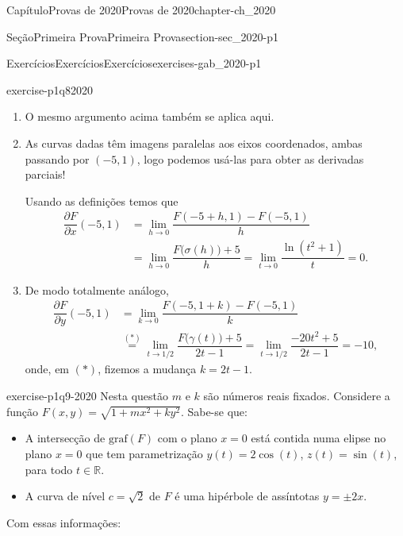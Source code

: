 \documentclass[oneside,10pt,]{book}
\numberwithin{equation}{section}
\begin{document}
\begin{chapterptx}{Capítulo}{Provas de 2020}{}{Provas de 2020}{}{}{chapter-ch_2020}
\begin{sectionptx}{Seção}{Primeira Prova}{}{Primeira Prova}{}{}{section-sec_2020-p1}
\begin{exercises-subsection-numberless}{Exercícios}{Exercícios}{}{Exercícios}{}{}{exercises-gab_2020-p1}
\begin{divisionexercise}{8}{}{}{exercise-p1q82020}
\begin{enumerate}[label=\roman*]
\begin{align*}
\lim\limits_{t\to 1/2}F\big(\gamma(t)\big)&
=\lim\limits_{t\to 1/2}-20t^2=-5\text{ e}\\
\lim\limits_{t\to 0}F\big(\sigma(t)\big)&
=\lim\limits_{t\to 0}\ln(t^2+1)-5=-5,
\end{align*}
temos informações sobre \(F\) apenas ao longo de duas curvas. Poderia haver uma terceira curva ao longo da qual a função não tem o mesmo comportamento, o que mostraria sua descontinuidade ali.%
\item{}O mesmo argumento acima também se aplica aqui.%
\item{}As curvas dadas têm imagens paralelas aos eixos coordenados, ambas passando por \((-5,1)\), logo podemos usá-las para obter as derivadas parciais!%
\par
Usando as definições temos que%
\begin{align*}
\dfrac{\partial F}{\partial x}(-5,1)&
=\lim\limits_{h\to 0}\dfrac{F(-5+h,1)-F(-5,1)}{h}\\
&=\lim\limits_{h\to 0}\dfrac{F\big(\sigma(h)\big)+5}{h}=
\lim\limits_{t\to
0}\dfrac{\ln(t^2+1)}{t}=0.
\end{align*}
%
\item{}De modo totalmente análogo,%
\begin{align*}
\dfrac{\partial F}{\partial y}(-5,1)&
=\lim\limits_{k\to 0}\dfrac{F(-5,1+k)-F(-5,1)}{k}\\
&
\stackrel{(\ast)}{=}\lim\limits_{t\to
1/2}\dfrac{F\big(\gamma(t)\big)+5}{2t-1}
=\lim\limits_{t\to
1/2}\dfrac{-20t^2+5}{2t-1}=-10,
\end{align*}
onde, em \((\ast)\), fizemos a mudança \(k=2t-1\).%
\end{enumerate}
\end{divisionexercise}%
\begin{divisionexercise}{9}{}{}{exercise-p1q9-2020}%
Nesta questão \(m\) e \(k\) são números reais fixados. Considere a função \(F(x,y) = \sqrt
{1+mx^2+ky^2}\). Sabe-se que:%
\begin{itemize}[label=\textbullet]
\item{}A intersecção de \(\text {graf}(F)\) com o plano \(x=0\) está contida numa elipse no plano \(x=0\) que tem parametrização \(y(t) = 2 \cos (t)\), \(z(t) = \sin
(t)\), para todo \(t \in \mathbb {R}.\)%
\item{}A curva de nível \(c = \sqrt {2}\) de \(F\) é uma hipérbole de assíntotas \(y = \pm 2x\).%
\end{itemize}
%
\par
Com essas informações:%
\begin{enumerate}[label=\alph*]

\end{enumerate}
\end{divisionexercise}
\end{exercises-subsection-numberless}
\end{sectionptx}
\end{chapterptx}
\end{document}
